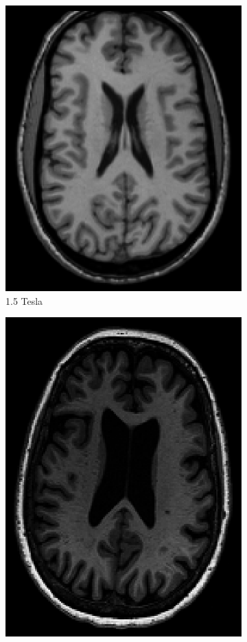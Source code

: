 \documentclass[10pt,twoside]{book}
\begin{document}
\begin{figure}
  \centering
  \begin{subfigure}[t]{0.33\textwidth}
    \centering
    \includegraphics[height=\textwidth]{biasField1pt5T}
    \caption{1.5 Tesla}
  \end{subfigure}
  \hspace{-1ex}
  \begin{subfigure}[t]{0.33\textwidth}
    \centering
    \includegraphics[height=\textwidth]{biasField3T}

\end{subfigure}
\end{figure}
\end{document}

